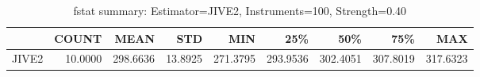 \begin{table}[ht]
\centering
\caption{fstat summary: Estimator=JIVE2, Instruments=100, Strength=0.40}
\begin{tabular}{lrrrrrrrr}
\toprule
 & COUNT & MEAN & STD & MIN & 25\% & 50\% & 75\% & MAX \\
\midrule
JIVE2 & 10.0000 & 298.6636 & 13.8925 & 271.3795 & 293.9536 & 302.4051 & 307.8019 & 317.6323 \\
\bottomrule
\end{tabular}
\end{table}
